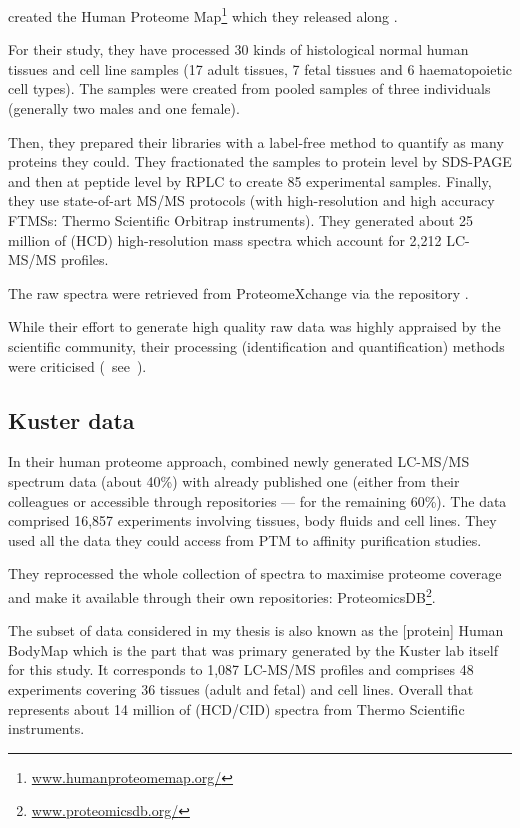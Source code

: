 \cite{PandeyData} created the Human Proteome Map\footnote{%
\href{http://www.humanproteomemap.org/}{\small www.humanproteomemap.org/}} which
they released along .

For their study, they have processed 30 kinds of histological normal human
tissues and cell line samples (17 adult tissues, 7 fetal tissues and 6
haematopoietic cell types). The samples were created from pooled samples of three
individuals (generally two males and one female).

Then, they prepared their libraries with a label-free method to quantify
as many proteins they could. They fractionated the samples to protein level by
\gls{SDS-PAGE} and then at peptide level by \gls{RPLC} to create 85 experimental
samples. Finally, they use state-of-art \gls{MS/MS} protocols
(with high-resolution and high accuracy \glspl{FTMS}:
Thermo Scientific Orbitrap instruments).
They generated about 25 million of (\gls{HCD})
high-resolution mass spectra which account for 2,212 \gls{LC-MS/MS} profiles.

The raw spectra were retrieved from ProteomeXchange via the repository
.

While their effort to generate high quality raw data was highly appraised
by the scientific community, their processing
(identification and quantification) methods were
criticised (\eg\ see~\cite{Ezkurdia2014-qx}).

\subsection{Kuster data}

In their human proteome approach,
\cite{KusterData} combined newly generated \gls{LC-MS/MS} spectrum
data (about 40\%) with already published one
(either from their colleagues or accessible through repositories ---
for the remaining 60\%).
The data comprised 16,857 experiments involving tissues, body fluids and cell
lines. They used all the data they could access from \gls{PTM} to affinity
purification studies.

They reprocessed the whole collection of spectra to maximise proteome coverage
and make it available through their own repositories: ProteomicsDB\footnote{%
\href{https://www.proteomicsdb.org/}{www.proteomicsdb.org/}}.

The subset of data considered in my thesis is also
known as the [protein] Human BodyMap which is the part that was primary generated
by the Kuster lab itself for this study. It corresponds to 1,087 \gls{LC-MS/MS}
profiles and comprises 48 experiments covering 36 tissues (adult and fetal) and
cell lines. Overall that represents about 14 million of (\gls{HCD}/\gls{CID})
spectra from Thermo Scientific instruments.

